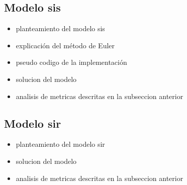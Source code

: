 \documentclass{article}
\begin{document}
\subsection{Modelo sis}
\begin{itemize}
    \item planteamiento del modelo sis 
    \item explicación del método de Euler 
    \item pseudo codigo de la implementación
    \item solucion del modelo 
    \item analisis de metricas descritas en la subseccion anterior
\end{itemize}
\subsection{Modelo sir}
\begin{itemize}
    \item planteamiento del modelo sir
    \item solucion del modelo 
    \item analisis de metricas descritas en la subseccion anterior
\end{itemize}



\end{document}

